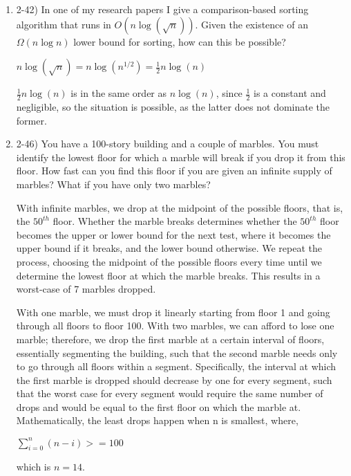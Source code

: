 \documentclass{article}
\begin{document}
\begin{enumerate}
    \item 2-42) In one of my research papers I give a comparison-based sorting algorithm that runs in $O(n \log(\sqrt{n}))$. Given the existence of an $\Omega(n \log n)$ lower bound for sorting, how can this be possible?
    
    \(n \log(\sqrt{n}) = n \log(n^{1/2}) = \frac{1}{2} n \log(n)\)

    \(\frac{1}{2} n \log(n) \) is in the same order as \(n \log(n)\), since \(\frac{1}{2}\) is a constant and negligible, so the situation is possible, as the latter does not dominate the former.
    
    \item 2-46) You have a 100-story building and a couple of marbles. You must identify the lowest floor for which a marble will break if you drop it from this floor. How fast can you find this floor if you are given an infinite supply of marbles? What if you have only two marbles?

    With infinite marbles, we drop at the midpoint of the possible floors, that is, the $50^{th}$ floor. Whether the marble breaks determines whether the $50^{th}$ floor becomes the upper or lower bound for the next test, where it becomes the upper bound if it breaks, and the lower bound otherwise. We repeat the process, choosing the midpoint of the possible floors every time until we determine the lowest floor at which the marble breaks. This results in a worst-case of 7 marbles dropped.

    With one marble, we must drop it linearly starting from floor 1 and going through all floors to floor 100. With two marbles, we can afford to lose one marble; therefore, we drop the first marble at a certain interval of floors, essentially segmenting the building, such that the second marble needs only to go through all floors within a segment. Specifically, the interval at which the first marble is dropped should decrease by one for every segment, such that the worst case for every segment would require the same number of drops and would be equal to the first floor on which the marble at. Mathematically, the least drops happen when n is smallest, where,
    
    \(\sum^n_{i=0}(n-i) >= 100\)

    which is $ n = 14$.
    
\end{enumerate}
\end{document}
